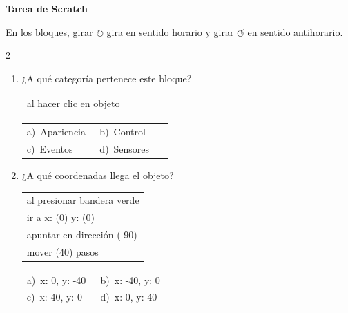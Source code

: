 \documentclass[11pt,a4paper]{article}
\begin{document}
\frenchspacing
{\Large\bfseries Tarea de Scratch}
\vspace{6pt}

En los bloques, girar $\circlearrowright$ gira en sentido horario y girar $\circlearrowleft$ en sentido antihorario.
\vspace{10pt}
\begin{multicols}{2}
\begin{enumerate}[label=\textbf{\arabic*.},leftmargin=*,itemsep=10pt,topsep=0pt]
\item \begin{minipage}[t]{\linewidth}
¿A qué categoría pertenece este bloque?
\par\vspace{3pt}\hspace*{1em}\begin{tabular}{@{}l@{}}\ttfamily\small al hacer clic en objeto
\end{tabular}\par

\vspace{4pt}
\begin{tabular}{@{}p{0.47\linewidth}p{0.47\linewidth}@{}}
a)~Apariencia & b)~Control \\
c)~Eventos & d)~Sensores \\
\end{tabular}
\end{minipage}

\item \begin{minipage}[t]{\linewidth}
¿A qué coordenadas llega el objeto?
\par\vspace{3pt}\hspace*{1em}\begin{tabular}{@{}l@{}}\ttfamily\small al presionar bandera verde \\
\ttfamily\small ir a x: (0) y: (0) \\
\ttfamily\small apuntar en dirección (-90) \\
\ttfamily\small mover (40) pasos
\end{tabular}\par

\vspace{4pt}
\begin{tabular}{@{}p{0.47\linewidth}p{0.47\linewidth}@{}}
a)~x: 0, y: -40 & b)~x: -40, y: 0 \\
c)~x: 40, y: 0 & d)~x: 0, y: 40 \\
\end{tabular}
\end{minipage}


\end{enumerate}
\end{multicols}
\end{document}
